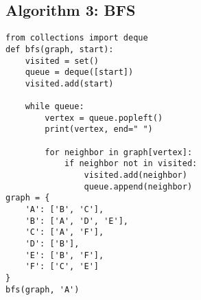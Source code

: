 \documentclass{article}
\begin{document}
\subsection{Algorithm 3: BFS}
\begin{verbatim}
from collections import deque
def bfs(graph, start):
    visited = set()
    queue = deque([start])
    visited.add(start)

    while queue:
        vertex = queue.popleft()
        print(vertex, end=" ")

        for neighbor in graph[vertex]:
            if neighbor not in visited:
                visited.add(neighbor)
                queue.append(neighbor)
graph = {
    'A': ['B', 'C'],
    'B': ['A', 'D', 'E'],
    'C': ['A', 'F'],
    'D': ['B'],
    'E': ['B', 'F'],
    'F': ['C', 'E']
}
bfs(graph, 'A')
\end{verbatim}
\end{document}
